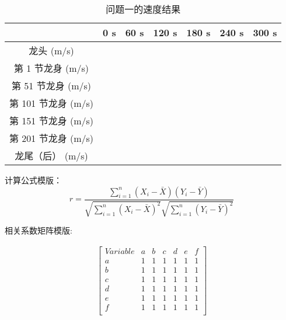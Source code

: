 \documentclass[a4paper]{article}
\begin{document}
		\begin{table}[H] %
		\captionsetup{skip=4pt} %
		\caption{问题一的速度结果}
		\centering
		\setlength{\arrayrulewidth}{0.5pt} %
		\begin{tabular}{|c|c|c|c|c|c|c|} %
			\hline
			& 0 s & 60 s & 120 s & 180 s & 240 s & 300 s \\ \hline
			龙头 (m/s)      &     &      &       &       &       &       \\ \hline
			第 1 节龙身 (m/s) &     &      &       &       &       &       \\ \hline
			第 51 节龙身 (m/s) &     &      &       &       &       &       \\ \hline
			第 101 节龙身 (m/s) &     &      &       &       &       &       \\ \hline
			第 151 节龙身 (m/s) &     &      &       &       &       &       \\ \hline
			第 201 节龙身 (m/s) &     &      &       &       &       &       \\ \hline
			龙尾（后） (m/s) &     &      &       &       &       &       \\ \hline
		\end{tabular}
		\end{table}
	
	
	
	
	
		
	
		计算公式模版：
		\begin{equation}
			r=\frac{\sum_{i=1}^n\left(X_i-\bar{X}\right)\left(Y_i-\bar{Y}\right)}{\sqrt{\sum_{i=1}^n\left(X_i-\bar{X}\right)^2} \sqrt{\sum_{i=1}^n\left(Y_i-\bar{Y}\right)^2}}
		\end{equation}
		
		相关系数矩阵模版:
		
		\begin{gather*}
			\begin{bmatrix}
				Variable & a & b & c & d & e & f \\
				a & 1 & 1 & 1 & 1 & 1 & 1 \\
				b & 1 & 1 & 1 & 1 & 1 & 1 \\
				c & 1 & 1 & 1 & 1 & 1 & 1 \\
				d & 1 & 1 & 1 & 1 & 1 & 1 \\
				e & 1 & 1 & 1 & 1 & 1 & 1 \\
				f & 1 & 1 & 1 & 1 & 1 & 1 \\
			\end{bmatrix}
		\end{gather*}
	
\end{document}
